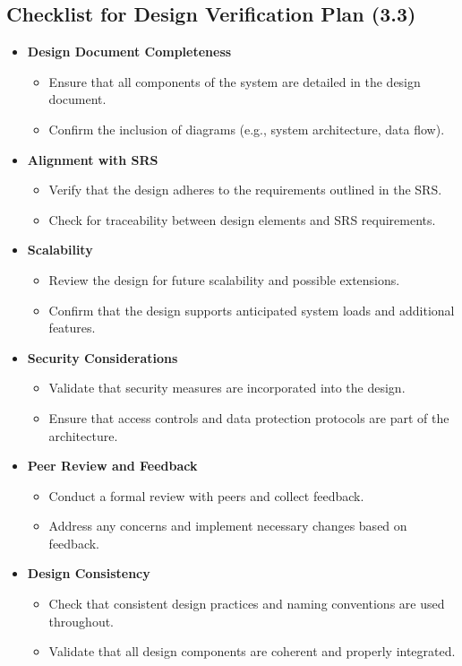 \documentclass[12pt, titlepage]{article}
\begin{document}
\subsection*{Checklist for Design Verification Plan (3.3)}
\begin{itemize}
    \item \textbf{Design Document Completeness}
    \begin{itemize}
        \item Ensure that all components of the system are detailed in the design document.
        \item Confirm the inclusion of diagrams (e.g., system architecture, data flow).
    \end{itemize}
    \item \textbf{Alignment with SRS}
    \begin{itemize}
        \item Verify that the design adheres to the requirements outlined in the SRS.
        \item Check for traceability between design elements and SRS requirements.
    \end{itemize}
    \item \textbf{Scalability}
    \begin{itemize}
        \item Review the design for future scalability and possible extensions.
        \item Confirm that the design supports anticipated system loads and additional features.
    \end{itemize}
    \item \textbf{Security Considerations}
    \begin{itemize}
        \item Validate that security measures are incorporated into the design.
        \item Ensure that access controls and data protection protocols are part of the architecture.
    \end{itemize}
    \item \textbf{Peer Review and Feedback}
    \begin{itemize}
        \item Conduct a formal review with peers and collect feedback.
        \item Address any concerns and implement necessary changes based on feedback.
    \end{itemize}
    \item \textbf{Design Consistency}
    \begin{itemize}
        \item Check that consistent design practices and naming conventions are used throughout.
        \item Validate that all design components are coherent and properly integrated.
    \end{itemize}
\end{itemize}
\end{document}
